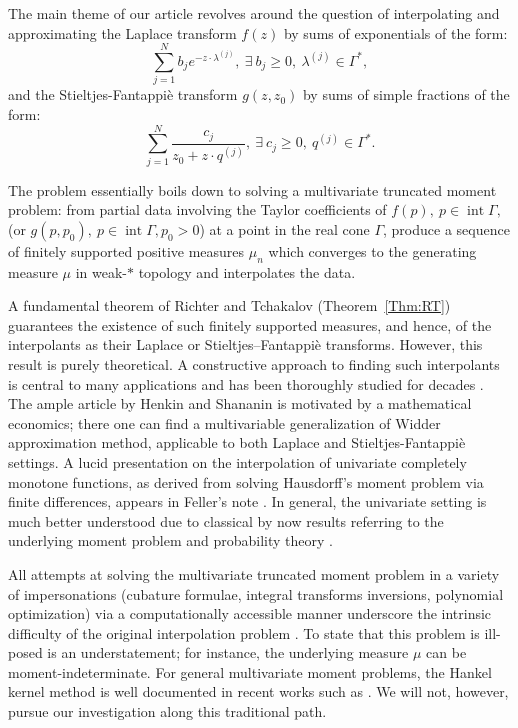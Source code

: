 \documentclass[11pt,reqno]{amsart}
\theoremstyle{plain}
\theoremstyle{definition}
\numberwithin{equation}{section}
\begin{document}
 The main theme of our article revolves around the question of interpolating and approximating the Laplace transform $f(z)$ by sums of exponentials of the form: 
 $$
 \sum_{j=1}^N b_j e^{-z\cdot \lambda^{(j)}}, \ \exists \ b_j \geq 0, \ \lambda^{(j)} \in \Gamma^*,$$ and the Stieltjes-Fantappi\`e transform $g(z, z_0)$ by sums of simple fractions of the form:
 $$\sum_{j=1}^N \frac{c_j}{z_0 + z \cdot q^{(j)}}, \  \exists \ c_j \geq 0, \ q^{(j)} \in \Gamma^*.$$
 
The problem essentially boils down to solving a multivariate truncated moment problem: from partial data involving the Taylor coefficients of $f(p), \ p \in \operatorname{int} \Gamma,$ (or $g(p, p_0), \ p \in \operatorname{int} \Gamma, p_0 >0$) at a point in the real cone $\Gamma$, produce a sequence of finitely supported positive measures $\mu_n$ which converges to the generating measure $\mu$ in weak-$\ast$ topology and interpolates the data.

A fundamental theorem of Richter and Tchakalov (Theorem~\ref{Thm:RT}) guarantees the existence of such finitely supported measures, and hence, of the interpolants as their Laplace or Stieltjes–Fantappi\`e transforms. However, this result is purely theoretical. A constructive approach to finding such interpolants is central to many applications and has been thoroughly studied for decades \cite{Beylkin, Kammler-2, Kammler, Koyama, Loy-Anderssen, Maergoiz}. The ample article by Henkin and Shananin  \cite{HS} is motivated by a mathematical economics; there one can find a multivariable generalization of Widder approximation method, applicable to both Laplace and Stieltjes-Fantappi\`e settings.  A lucid presentation on the interpolation of univariate completely monotone functions, as derived from solving Hausdorff's moment problem via finite differences, appears in Feller's note \cite{Feller}. In general, the univariate setting is much better understood due to classical by now results referring to the underlying moment problem and probability theory
\cite{Akhiezer, SSV}.



All attempts at solving the multivariate truncated moment problem in a variety of impersonations (cubature formulae, integral transforms inversions, polynomial optimization) via a computationally accessible manner underscore the intrinsic difficulty of the original interpolation problem \cite{Cools, Mnatsakanov, Lasserre}. To state that this problem is ill-posed is an understatement; for instance, the underlying measure $\mu$ can be moment-indeterminate. For general multivariate moment problems, the Hankel kernel method is well documented in recent works such as \cite{Mourrain-cubature, Mourrain, Evelyne}.  We will not, however, pursue our investigation along this traditional path.
\end{document}

